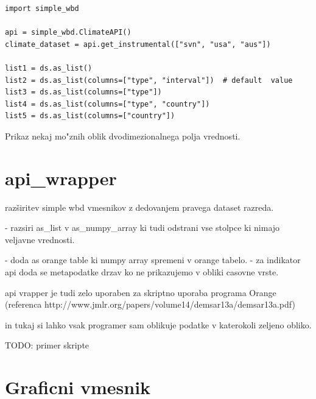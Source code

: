 \begin{snippet}
\begin{center}
\begin{lstlisting}
import simple_wbd

api = simple_wbd.ClimateAPI()                   
climate_dataset = api.get_instrumental(["svn", "usa", "aus"])

list1 = ds.as_list()
list2 = ds.as_list(columns=["type", "interval"])  # default  value
list3 = ds.as_list(columns=["type"])
list4 = ds.as_list(columns=["type", "country"]) 
list5 = ds.as_list(columns=["country"])
\end{lstlisting}
\end{center}
\cprotect
\caption{Prikaz nekaj mo"znih oblik dvodimezionalnega polja vrednosti.} 
\label{list_configurations}
\end{snippet} 



\section{api\_wrapper}



razširitev simple wbd vmesnikov z dedovanjem pravega dataset razreda.


- razsiri as\_list v as\_numpy\_array ki tudi odstrani vse stolpce ki nimajo 
  veljavne vrednosti.

- doda as orange table ki numpy array spremeni v orange tabelo.
  - za indikator api doda se metapodatke drzav ko ne prikazujemo v obliki casovne vrste.


api vrapper je tudi zelo uporaben za skriptno uporaba programa Orange 
(referenca http://www.jmlr.org/papers/volume14/demsar13a/demsar13a.pdf)

in tukaj si lahko vsak programer sam oblikuje podatke v katerokoli zeljeno obliko.


TODO: primer skripte






\section{Graficni vmesnik}


